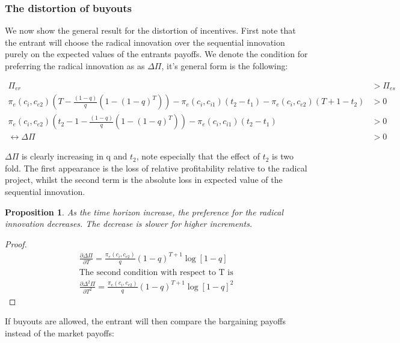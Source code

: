 \documentclass[11pt]{article}
\newtheorem{proposition}{Proposition}
\begin{document}
\subsubsection{The distortion of buyouts}

We now show the general result for the distortion of incentives. First note that the entrant will choose the radical innovation over the sequential innovation purely on the expected values of the entrants payoffs. We denote the condition for preferring the radical innovation as as $\Delta \Pi$, it's general form is the following: 

\begin{align*}
\Pi_{er}  &> \Pi_{es}   \\
\pi_{e}(c_i,c_{e2}) \left( T - \frac{(1-q)}{q} \left( 1-(1-q)^T \right) \right) - \pi_e(c_i,c_{i1}) (t_2-t_1) -\pi_e(c_i,c_{e2})(T+1-t_2) &> 0 \\
\pi_{e}(c_i,c_{e2}) \left( t_2 -1- \frac{(1-q)}{q} \left( 1-(1-q)^T \right) \right) - \pi_e(c_i,c_{i1}) (t_2-t_1)  &> 0 \\
\leftrightarrow
\Delta \Pi &> 0
\end{align*}

$\Delta \Pi$ is clearly increasing in q and $t_2$, note especially that the effect of $t_2$ is two fold. The first appearance is the loss of relative profitability relative to the radical project, whilst the second term is the absolute loss in expected value of the sequential innovation. 

\begin{proposition}
As the time horizon increase, the preference for the radical innovation decreases. The decrease is slower for higher increments. 
\end{proposition}

\begin{proof}
\begin{align*}
\frac{\partial \Delta \Pi}{\partial T}=\frac{\pi_{e}(c_i,c_{e2})}{q} (1-q)^{T+1} \log[1-q] \\
\text{The second condition with respect to T is} \\
\frac{\partial \Delta^2 \Pi}{\partial T^2} = \frac{\pi_{e}(c_i,c_{e2})}{q} (1-q)^{T+1} \log[1-q]^2
\end{align*}
\end{proof}

If buyouts are allowed, the entrant will then compare the bargaining payoffs instead of the market payoffs: 
\end{document}
